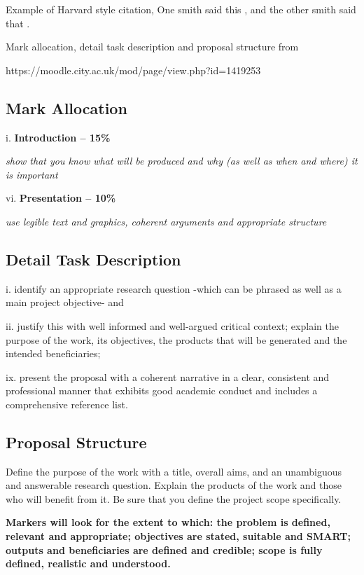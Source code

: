 Example of Harvard style citation, One smith said this \parencite{Smith:2013jd}, and the other smith said that \parencite{Smith:2012qr}.

Mark allocation, detail task description and proposal structure from

https://moodle.city.ac.uk/mod/page/view.php?id=1419253
\subsection{Mark Allocation}

i. \textbf{Introduction -- 15\%}

\textit{show that you know what will be produced and why (as well as when and where) it is important}

vi. \textbf{Presentation -- 10\%}

\textit{use legible text and graphics, coherent arguments and appropriate structure}

\subsection{Detail Task Description}

i. identify an appropriate research question -which can be phrased as well as a main project objective- and

ii. justify this with well informed and well-argued critical context;
explain the purpose of the work, its objectives, the products that will be generated and the intended beneficiaries;

ix. present the proposal with a coherent narrative in a clear, consistent and professional manner that exhibits good academic conduct and includes a comprehensive reference list. 

\subsection{Proposal Structure} 

Define the purpose of the work with a title, overall aims, and an unambiguous and answerable research question. Explain the products of the work and those who will benefit from it. Be sure that you define the project scope specifically.

\textbf{Markers will look for the extent to which: the problem is defined, relevant and appropriate; objectives are stated, suitable and SMART; outputs and beneficiaries are defined and credible; scope is fully defined, realistic and understood.}

